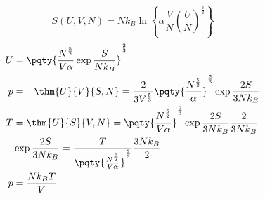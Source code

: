 \documentclass[12pt]{article}
\begin{document}
        \subsection{} {  \[
            S(U,V,N) = Nk_B \ln\left\{\alpha\frac{V}{N}\left(\frac{U}{N}\right)^\frac{3}{2}\right\}
        \]}
        \begin{align*}
            U &=  \pqty{\frac{N^ \frac{5}{2}}{V\alpha} \exp {\frac{S}{Nk_B}}}^\frac{2}{3}\\
            p &=  -\thm{U}{V}{S,N} = \frac{2}{3 V^ \frac{5}{3} }\pqty{\frac{N^ \frac{5}{2}}{\alpha} }^\frac{2}{3}\exp {\frac{2S}{3Nk_B}}\\
            T &= \thm{U}{S}{V,N} = \pqty{\frac{N^ \frac{5}{2}}{V\alpha}}^\frac{2}{3} \exp {\frac{2S}{3Nk_B}}\frac{2}{3Nk_B}\\
            &\exp {\frac{2S}{3Nk_B}} = \frac{T}{\pqty{\frac{N^ \frac{5}{2}}{V\alpha}}^\frac{2}{3}} \frac{3Nk_B}{2}\\
            p &= \frac{Nk_BT}{ V }
        \end{align*}
\end{document}
